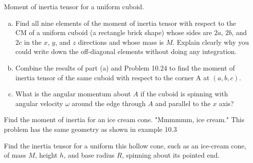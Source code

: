 \documentclass[11pt,letterpaper,boxed]{../hmcpsetrhino}
\begin{document}
\newpage

\begin{problem}[iii]
Moment of inertia tensor for a uniform cuboid.

\begin{problem}[10.25]
\begin{enumerate}[(a)]
\item Find all nine elements of the moment of inertia tensor with respect to the CM of a uniform cuboid (a rectangle brick shape) whose sides are $2a$, $2b$, and $2c$ in the $x$, $y$, and $z$ directions and whose mass is $M$. Explain clearly why you could write down the off-diagonal elements without doing any integration. 

\item Combine the results of part (a) and Problem 10.24 to find the moment of inertia tensor of the same cuboid with respect to the corner A at $(a, b, c)$.

\item What is the angular momentum about $A$ if the cuboid is spinning with angular velocity $\omega$ around the edge through $A$ and parallel to the $x$ axis?

\end{enumerate}

\end{problem}
\end{problem}
\begin{solution}
\vfill
\end{solution}


\newpage

\begin{problem}[iv]
Find the moment of inertia for an ice cream cone. "Mmmmmm, ice cream." This problem has the same geometry as shown in example 10.3

\begin{problem}[10.27]
Find the inertia tensor for a uniform this hollow cone, such as an ice-cream cone, of mass $M$, height $h$, and base radius $R$, spinning about its pointed end.

\end{problem}
\end{problem}
\begin{solution}
\vfill
\end{solution}
\end{document}
